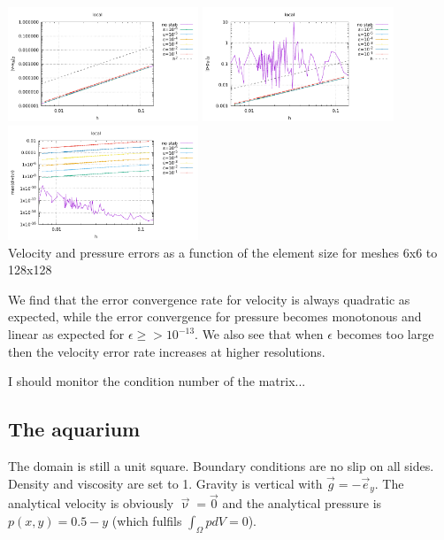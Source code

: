 \begin{center}
\includegraphics[width=5.7cm]{python_codes/fieldstone_115/results/dh/errorsV_local.pdf}
\includegraphics[width=5.7cm]{python_codes/fieldstone_115/results/dh/errorsP_local.pdf}
\includegraphics[width=5.7cm]{python_codes/fieldstone_115/results/dh/divv_local.pdf}\\
{\captionfont Velocity and pressure errors as a function of the element size for meshes 6x6 to 128x128}
\end{center}
We find that the error convergence rate for velocity is always quadratic as expected, 
while the error convergence for pressure becomes monotonous and linear as expected for $\epsilon\ge >10^{-13}$.
We also see that when $\epsilon$ becomes too large then the velocity error rate increases at higher resolutions.


I should monitor the condition number of the matrix...

\newpage
\subsection{The aquarium}

The domain is still a unit square. Boundary conditions are no slip on all sides. 
Density and viscosity are set to 1. Gravity is vertical with $\vec{g}=-\vec{e}_y$.
The analytical velocity is obviously $\vec\upnu=\vec{0}$ and the analytical pressure
is $p(x,y)=0.5-y$ (which fulfils $\int_\Omega p dV=0$).

